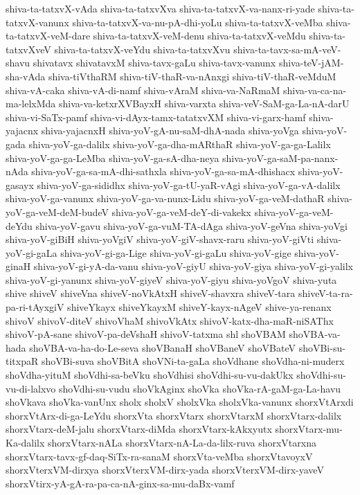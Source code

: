 {shiva-ta-tatxvX-vAda
shiva-ta-tatxvXva
shiva-ta-tatxvX-va-nanx-ri-yade
shiva-ta-tatxvX-vanunx
shiva-ta-tatxvX-va-nu-pA-dhi-yoLu
shiva-ta-tatxvX-veMba
shiva-ta-tatxvX-veM-dare
shiva-ta-tatxvX-veM-denu
shiva-ta-tatxvX-veMdu
shiva-ta-tatxvXveV
shiva-ta-tatxvX-veYdu
shiva-ta-tatxvXvu
shiva-ta-tavx-sa-mA-veV-shavu
shivatavx
shivatavxM
shiva-tavx-gaLu
shiva-tavx-vanunx
shiva-teV-jAM-sha-vAda
shiva-tiVthaRM
shiva-tiV-thaR-va-nAnxgi
shiva-tiV-thaR-veMduM
shiva-vA-caka
shiva-vA-di-namf
shiva-vAraM
shiva-va-NaRmaM
shiva-va-ca-na-ma-lelxMda
shiva-va-ketxrXVBayxH
shiva-varxta
shiva-veV-SaM-ga-La-nA-darU
shiva-vi-SaTx-pamf
shiva-vi-dAyx-tamx-tatatxvXM
shiva-vi-garx-hamf
shiva-yajacnx
shiva-yajacnxH
shiva-yoV-gA-nu-saM-dhA-nada
shiva-yoVga
shiva-yoV-gada
shiva-yoV-ga-dalilx
shiva-yoV-ga-dha-mARthaR
shiva-yoV-ga-ga-Lalilx
shiva-yoV-ga-ga-LeMba
shiva-yoV-ga-sA-dha-neya
shiva-yoV-ga-saM-pa-nanx-nAda
shiva-yoV-ga-sa-mA-dhi-sathxla
shiva-yoV-ga-sa-mA-dhishacx
shiva-yoV-gasayx
shiva-yoV-ga-sididhx
shiva-yoV-ga-tU-yaR-vAgi
shiva-yoV-ga-vA-dalilx
shiva-yoV-ga-vanunx
shiva-yoV-ga-va-nunx-Lidu
shiva-yoV-ga-veM-dathaR
shiva-yoV-ga-veM-deM-budeV
shiva-yoV-ga-veM-deY-di-vakekx
shiva-yoV-ga-veM-deYdu
shiva-yoV-gavu
shiva-yoV-ga-vuM-TA-dAga
shiva-yoV-geVna
shiva-yoVgi
shiva-yoV-giBiH
shiva-yoVgiV
shiva-yoV-giV-shavx-raru
shiva-yoV-giVti
shiva-yoV-gi-gaLa
shiva-yoV-gi-ga-Lige
shiva-yoV-gi-gaLu
shiva-yoV-gige
shiva-yoV-ginaH
shiva-yoV-gi-yA-da-vanu
shiva-yoV-giyU
shiva-yoV-giya
shiva-yoV-gi-yalilx
shiva-yoV-gi-yanunx
shiva-yoV-giyeV
shiva-yoV-giyu
shiva-yoVgoV
shiva-yuta
shive
shiveV
shiveVna
shiveV-noVkAtxH
shiveV-shavxra
shiveV-tara
shiveV-ta-ra-pa-ri-tAyxgiV
shiveYkayx
shiveYkayxM
shiveY-kayx-nAgeV
shive-ya-renanx
shivoV
shivoV-diteV
shivoVhaM
shivoVkAtx
shivoV-katx-dha-maR-niSAThx
shivoV-pA-sane
shivoV-pa-deVshaH
shivoV-tatxma
shl
shoVBAM
shoVBA-va-hada
shoVBA-va-ha-do-Le-seva
shoVBanaH
shoVBaneV
shoVBateV
shoVBi-su-titxpaR
shoVBi-suva
shoVBitA
shoVNi-ta-gaLa
shoVdhane
shoVdha-ni-muderx
shoVdha-yituM
shoVdhi-sa-beVku
shoVdhisi
shoVdhi-su-vu-dakUkx
shoVdhi-su-vu-di-lalxvo
shoVdhi-su-vudu
shoVkAginx
shoVka
shoVka-rA-gaM-ga-La-havu
shoVkava
shoVka-vanUnx
sholx
sholxV
sholxVka
sholxVka-vanunx
shorxVtArxdi
shorxVtArx-di-ga-LeYdu
shorxVta
shorxVtarx
shorxVtarxM
shorxVtarx-dalilx
shorxVtarx-deM-jalu
shorxVtarx-diMda
shorxVtarx-kAkxyutx
shorxVtarx-mu-Ka-dalilx
shorxVtarx-nALa
shorxVtarx-nA-La-da-lilx-ruva
shorxVtarxna
shorxVtarx-tavx-gf-daq-SiTx-ra-sanaM
shorxVta-veMba
shorxVtavoyxV
shorxVterxVM-dirxya
shorxVterxVM-dirx-yada
shorxVterxVM-dirx-yaveV
shorxVtirx-yA-gA-ra-pa-ca-nA-ginx-sa-mu-daBx-vamf
}
